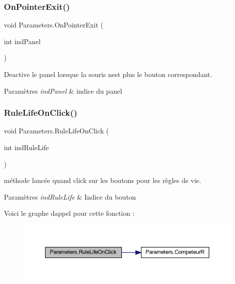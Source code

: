 \subsubsection{\texorpdfstring{On\+Pointer\+Exit()}{OnPointerExit()}}
{\footnotesize\ttfamily void Parameters.\+On\+Pointer\+Exit (\begin{DoxyParamCaption}\item[{int}]{ind\+Panel }\end{DoxyParamCaption})\hspace{0.3cm}{\ttfamily [inline]}}



Deactive le panel lorsque la souris n\textquotesingle{}est plus le bouton correspondant. 


\begin{DoxyParams}{Paramètres}
{\em ind\+Panel} & indice du panel\\
\hline
\end{DoxyParams}
\mbox{\label{class_parameters_ae90c0f90420620d98950ac50b9f24782}} 
\subsubsection{\texorpdfstring{Rule\+Life\+On\+Click()}{RuleLifeOnClick()}}
{\footnotesize\ttfamily void Parameters.\+Rule\+Life\+On\+Click (\begin{DoxyParamCaption}\item[{int}]{ind\+Rule\+Life }\end{DoxyParamCaption})\hspace{0.3cm}{\ttfamily [inline]}}



méthode lancée quand click sur les boutons pour les règles de vie. 


\begin{DoxyParams}{Paramètres}
{\em ind\+Rule\+Life} & Indice du bouton\\
\hline
\end{DoxyParams}
Voici le graphe d\textquotesingle{}appel pour cette fonction \+:
\nopagebreak
\begin{figure}[H]
\begin{center}
\leavevmode
\includegraphics[width=350pt]{class_parameters_ae90c0f90420620d98950ac50b9f24782_cgraph}
\end{center}
\end{figure}
\mbox{\label{class_parameters_af47f2d06943667d50ffbc35743ad522c}} 
